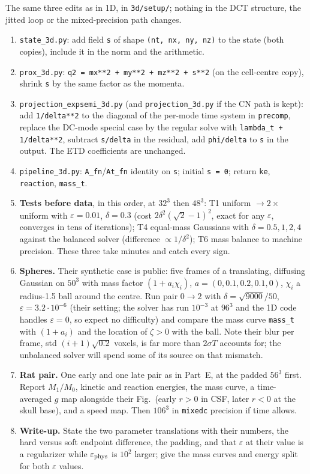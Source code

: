 \documentclass[11pt]{article}
\newcommand{\eps}{\varepsilon}
\newcommand{\code}[1]{\texttt{#1}}
\newcounter{ex}
\begin{document}
The same three edits as in 1D, in \code{3d/setup/}; nothing in the DCT structure, the jitted
loop or the mixed-precision path changes.
\begin{enumerate}
  \item \code{state\_3d.py}: add field \code{s} of shape \code{(nt, nx, ny, nz)} to the state
        (both copies), include it in the norm and the arithmetic.
  \item \code{prox\_3d.py}: \code{q2 = mx**2 + my**2 + mz**2 + s**2} (on the cell-centre copy),
        shrink \code{s} by the same factor as the momenta.
  \item \code{projection\_expsemi\_3d.py} (and \code{projection\_3d.py} if the CN path is
        kept): add \code{1/delta**2} to the diagonal of the per-mode time system in
        \code{precomp}, replace the DC-mode special case by the regular solve with
        \code{lambda\_t + 1/delta**2}, subtract \code{s/delta} in the residual, add
        \code{phi/delta} to \code{s} in the output. The ETD coefficients are unchanged.
  \item \code{pipeline\_3d.py}: \code{A\_fn}/\code{At\_fn} identity on \code{s}; initial
        \code{s = 0}; return \code{ke}, \code{reaction}, \code{mass\_t}.
  \item \textbf{Tests before data}, in this order, at $32^3$ then $48^3$: T1 uniform
        $\to2\times$uniform with $\eps=0.01$, $\delta=0.3$ (cost $2\delta^2(\sqrt2-1)^2$, exact for
        any $\eps$, converges in tens of iterations); T4 equal-mass Gaussians with
        $\delta=0.5,1,2,4$ against the balanced solver (difference $\propto1/\delta^2$); T6
        mass balance to machine precision. These three take minutes and catch every sign.
  \item \textbf{Spheres.} Their synthetic case is public: five frames of a translating,
        diffusing Gaussian on $50^3$ with mass factor $(1+a_i\chi_i)$, $a=(0,0.1,0.2,0.1,0)$,
        $\chi_i$ a radius-1.5 ball around the centre. Run pair $0\to2$ with $\delta=\sqrt{9000}/50$,
        $\eps=3.2\cdot10^{-6}$ (their setting; the solver has run $10^{-3}$ at $96^3$ and the
        1D code handles $\eps=0$, so expect no difficulty) and compare the mass curve
        \code{mass\_t} with $(1+a_i)$ and the location of $\zeta>0$ with the ball. Note their
        blur per frame, std $(i+1)\sqrt{0.2}$ voxels, is far more than $2\sigma T$ accounts for;
        the unbalanced solver will spend some of its source on that mismatch.
  \item \textbf{Rat pair.} One early and one late pair as in Part~E, at the padded $56^3$
        first. Report $M_1/M_0$, kinetic and reaction energies, the mass curve, a
        time-averaged $g$ map alongside their Fig.\ (early $r>0$ in CSF, later $r<0$ at the
        skull base), and a speed map. Then $106^3$ in \code{mixedc} precision if time allows.
  \item \textbf{Write-up.} State the two parameter translations with their numbers, the hard
        versus soft endpoint difference, the padding, and that $\eps$ at their value is a
        regularizer while $\eps_{\rm phys}$ is $10^2$ larger; give the mass curves and energy
        split for both $\eps$ values.
\end{enumerate}
\end{document}
